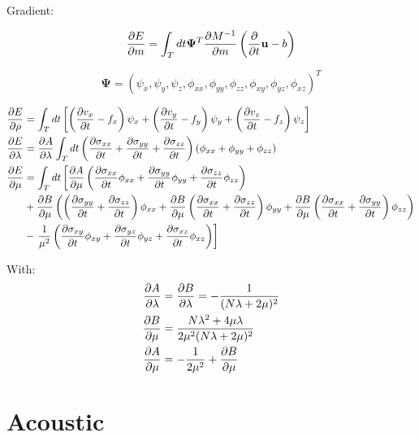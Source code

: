 \documentclass[pdftex,a4paper,parskip,listof=totoc,bibliography=totoc,onehalfspacing,12pt]{scrreprt}
\begin{document}
\vspace{0.3cm}

\begin{center} \Large{Gradient:}\end{center}

\begin{equation}
 \pdv{E}{m}=\int_T dt\mathbf{\Psi}^T \pdv{M^{-1}}{m}\left( \pdv{}{t}\mathbf{u}-b \right)
\end{equation}

\begin{equation}
\mathbf{ \Psi}=\left(\psi_x,\psi_y,\psi_z,\phi_{xx},\phi_{yy},\phi_{zz},\phi_{xy},\phi_{yz} ,\phi_{xz} \right)^T
\end{equation}

\begin{align}
 \pdv{E}{\rho}&=\int_T dt \left[ \left(\pdv{v_x}{t}-f_x\right)\psi_x +\left(\pdv{v_y}{t}-f_y\right)\psi_y +\left(\pdv{v_z}{t}-f_z\right)\psi_z \right]\\
 \pdv{E}{\lambda}&=\pdv{A}{\lambda}\int_T dt  \left(\pdv{\sigma_{xx}}{t}+\pdv{\sigma_{yy}}{t}+\pdv{\sigma_{zz}}{t}\right) \left(\phi_{xx}+\phi_{yy}+\phi_{zz}\right) \\
 \pdv{E}{\mu}&=\int_T dt \left[\pdv{A}{\mu}\left(\pdv{\sigma_{xx}}{t}\phi_{xx}+\pdv{\sigma_{yy}}{t}\phi_{yy}+\pdv{\sigma_{zz}}{t}\phi_{zz}\right)\right. \\
 &+ \pdv{B}{\mu} \left(\left(\pdv{\sigma_{yy}}{t}+\pdv{\sigma_{zz}}{t}\right)\phi_{xx}
 + \pdv{B}{\mu} \left(\pdv{\sigma_{xx}}{t}+\pdv{\sigma_{zz}}{t}\right)\phi_{yy}
  + \pdv{B}{\mu} \left(\pdv{\sigma_{xx}}{t}+\pdv{\sigma_{yy}}{t}\right)\phi_{zz}\right)\\
  &-\left.\frac{1}{\mu^2}\left(\pdv{\sigma_{xy}}{t}\phi_{xy}+\pdv{\sigma_{yz}}{t}\phi_{yz}+\pdv{\sigma_{xz}}{t}\phi_{xz}\right)\right]
\end{align}

With:
\begin{align}
 \pdv{A}{\lambda}&=\pdv{B}{\lambda}=-\frac{1}{(N\lambda+2\mu)^2} \\
 \pdv{B}{\mu}&=\frac{N\lambda^2+4\mu\lambda}{2\mu^2(N\lambda+2\mu)^2} \\
 \pdv{A}{\mu}&=-\frac{1}{2\mu^2}+\pdv{B}{\mu}
\end{align}


\section{Acoustic}
\label{kap:ac}
\end{document}

